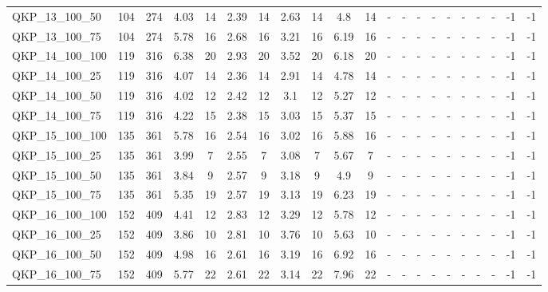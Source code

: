 \begin{sidewaystable}[!ht]
{\begin{tabular}{lcccccccccccccccccccc}
QKP\_13\_100\_50 & 104 & 274 & 4.03 & 14 &  \textcolor{blue2}{2.39} & 14 & 2.63 & 14 & 4.8 & 14 &  - &  - &  - &  - &  - &  - &  - &  - & -1 & -1 \\
QKP\_13\_100\_75 & 104 & 274 & 5.78 & 16 &  \textcolor{blue2}{2.68} & 16 & 3.21 & 16 & 6.19 & 16 &  - &  - &  - &  - &  - &  - &  - &  - & -1 & -1 \\
QKP\_14\_100\_100 & 119 & 316 & 6.38 & 20 &  \textcolor{blue2}{2.93} & 20 & 3.52 & 20 & 6.18 & 20 &  - &  - &  - &  - &  - &  - &  - &  - & -1 & -1 \\
QKP\_14\_100\_25 & 119 & 316 & 4.07 & 14 &  \textcolor{blue2}{2.36} & 14 & 2.91 & 14 & 4.78 & 14 &  - &  - &  - &  - &  - &  - &  - &  - & -1 & -1 \\
QKP\_14\_100\_50 & 119 & 316 & 4.02 & 12 &  \textcolor{blue2}{2.42} & 12 & 3.1 & 12 & 5.27 & 12 &  - &  - &  - &  - &  - &  - &  - &  - & -1 & -1 \\
QKP\_14\_100\_75 & 119 & 316 & 4.22 & 15 &  \textcolor{blue2}{2.38} & 15 & 3.03 & 15 & 5.37 & 15 &  - &  - &  - &  - &  - &  - &  - &  - & -1 & -1 \\
QKP\_15\_100\_100 & 135 & 361 & 5.78 & 16 &  \textcolor{blue2}{2.54} & 16 & 3.02 & 16 & 5.88 & 16 &  - &  - &  - &  - &  - &  - &  - &  - & -1 & -1 \\
QKP\_15\_100\_25 & 135 & 361 & 3.99 & 7 &  \textcolor{blue2}{2.55} & 7 & 3.08 & 7 & 5.67 & 7 &  - &  - &  - &  - &  - &  - &  - &  - & -1 & -1 \\
QKP\_15\_100\_50 & 135 & 361 & 3.84 & 9 &  \textcolor{blue2}{2.57} & 9 & 3.18 & 9 & 4.9 & 9 &  - &  - &  - &  - &  - &  - &  - &  - & -1 & -1 \\
QKP\_15\_100\_75 & 135 & 361 & 5.35 & 19 &  \textcolor{blue2}{2.57} & 19 & 3.13 & 19 & 6.23 & 19 &  - &  - &  - &  - &  - &  - &  - &  - & -1 & -1 \\
QKP\_16\_100\_100 & 152 & 409 & 4.41 & 12 &  \textcolor{blue2}{2.83} & 12 & 3.29 & 12 & 5.78 & 12 &  - &  - &  - &  - &  - &  - &  - &  - & -1 & -1 \\
QKP\_16\_100\_25 & 152 & 409 & 3.86 & 10 &  \textcolor{blue2}{2.81} & 10 & 3.76 & 10 & 5.63 & 10 &  - &  - &  - &  - &  - &  - &  - &  - & -1 & -1 \\
QKP\_16\_100\_50 & 152 & 409 & 4.98 & 16 &  \textcolor{blue2}{2.61} & 16 & 3.19 & 16 & 6.92 & 16 &  - &  - &  - &  - &  - &  - &  - &  - & -1 & -1 \\
QKP\_16\_100\_75 & 152 & 409 & 5.77 & 22 &  \textcolor{blue2}{2.61} & 22 & 3.14 & 22 & 7.96 & 22 &  - &  - &  - &  - &  - &  - &  - &  - & -1 & -1 \\

\end{tabular}}
\end{sidewaystable}
